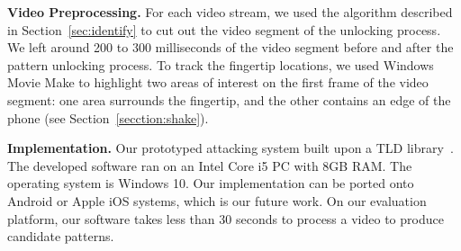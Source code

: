     \vspace{2mm}
    \noindent\textbf{Video Preprocessing.}
    For each video stream, we used the algorithm described in Section~\ref{sec:identify} to cut out the video segment
    of the unlocking process. We left around 200 to 300 milliseconds of the video segment before and after the pattern unlocking process.
    To track the fingertip locations,
    we used Windows Movie Make to highlight two areas of interest on the first frame of
    the video segment: one area surrounds the fingertip, and the other contains an edge of the
    phone (see Section~\ref {secction:shake}).

    \vspace{2mm}
   \noindent\textbf{Implementation.} Our prototyped attacking system built upon a TLD library~\cite{TLD-toolbox-web}.
    The developed software ran on an Intel Core i5 PC with
    8GB RAM. The operating system is Windows 10. Our implementation can be ported onto
    Android or Apple iOS systems, which is our future work. On our evaluation
    platform, our software takes less than 30 seconds to process a video to produce candidate patterns.
